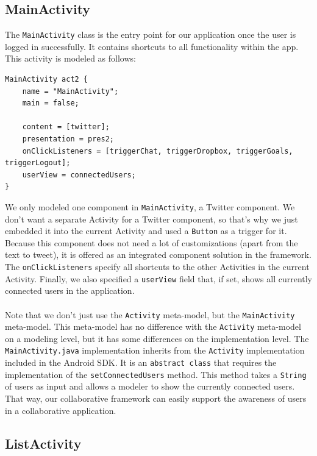 \subsection{MainActivity}

The \texttt{MainActivity} class is the entry point for our application once the user is logged in successfully. It contains shortcuts to all functionality within the app. This activity is modeled as follows:

\begin{lstlisting}[label=main-model,caption=MainActivity model, captionpos=t]
MainActivity act2 {
	name = "MainActivity";
	main = false;

	content = [twitter];
	presentation = pres2;
	onClickListeners = [triggerChat, triggerDropbox, triggerGoals, triggerLogout];
	userView = connectedUsers;
}
\end{lstlisting}
We only modeled one component in \texttt{MainActivity}, a Twitter component. We don't want a separate Activity for a Twitter component, so that's why we just embedded it into the current Activity and used a \texttt{Button} as a trigger for it. Because this component does not need a lot of customizations (apart from the text to tweet), it is offered as an integrated component solution in the framework. The \texttt{onClickListeners} specify all shortcuts to the other Activities in the current Activity. Finally, we also specified a \texttt{userView} field that, if set, shows all currently connected users in the application. \\ \\
Note that we don't just use the \texttt{Activity} meta-model, but the \texttt{MainActivity} meta-model. This meta-model has no difference with the \texttt{Activity} meta-model on a modeling level, but it has some differences on the implementation level. The \texttt{MainActivity.java} implementation inherits from the \texttt{Activity} implementation included in the Android SDK. It is an \texttt{abstract class} that requires  the implementation of the \texttt{setConnectedUsers} method. This method takes a \texttt{String} of users as input and allows a modeler to show the currently connected users. That way, our collaborative framework can easily support the awareness of users in a collaborative application.

\subsection{ListActivity}

